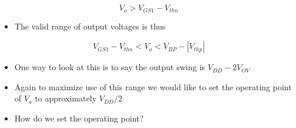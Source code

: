 \documentclass[11pt]{article}
\providecommand{\tightlist}{%
      \setlength{\itemsep}{0pt}\setlength{\parskip}{0pt}}
\begin{document}
\begin{equation}
V_o > V_{GS1} - V_{thn}
\end{equation}

\begin{itemize}
\tightlist
\item
  The valid range of output voltages is thus
\end{itemize}

\begin{equation}
V_{GS1} - V_{thn} < V_o < V_{BP} - |V_{thp}|
\end{equation}

\begin{itemize}
\tightlist
\item
  One way to look at this is to say the output swing is
  \(V_{DD} - 2V_{OV}\)
\item
  Again to maximize use of this range we would like to set the operating
  point of \(V_o\) to approximately \(V_{DD}/2\)
\item
  How do we set the operating point?
\end{itemize}
\end{document}
